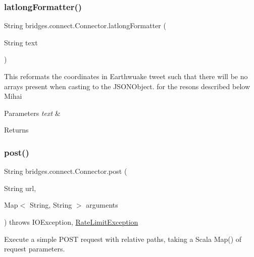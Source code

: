 \subsubsection{\texorpdfstring{latlong\+Formatter()}{latlongFormatter()}}
{\footnotesize\ttfamily String bridges.\+connect.\+Connector.\+latlong\+Formatter (\begin{DoxyParamCaption}\item[{String}]{text }\end{DoxyParamCaption})}

This reformats the coordinates in Earthwuake tweet such that there will be no arrays present when casting to the J\+S\+O\+N\+Object. for the resons described below Mihai 
\begin{DoxyParams}{Parameters}
{\em text} & \\
\hline
\end{DoxyParams}
\begin{DoxyReturn}{Returns}

\end{DoxyReturn}
\mbox{\label{classbridges_1_1connect_1_1_connector_a88e465aed707d59b96958dcc946ff6b4}} 
\subsubsection{\texorpdfstring{post()}{post()}\hspace{0.1cm}{\footnotesize\ttfamily [1/2]}}
{\footnotesize\ttfamily String bridges.\+connect.\+Connector.\+post (\begin{DoxyParamCaption}\item[{String}]{url,  }\item[{Map$<$ String, String $>$}]{arguments }\end{DoxyParamCaption}) throws I\+O\+Exception, \mbox{\hyperlink{classbridges_1_1validation_1_1_rate_limit_exception}{Rate\+Limit\+Exception}}}

Execute a simple P\+O\+ST request with relative paths, taking a Scala Map() of request parameters. \mbox{\label{classbridges_1_1connect_1_1_connector_a4b8978743a8c230b86500f5a00cb2697}} 
